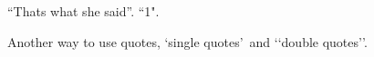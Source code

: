 \documentclass{article}
\begin{document}
``Thats what she said''.
``1".

Another way to use quotes, \lq single quotes\rq\ and 
\lq\lq double quotes\rq\rq.
\end{document}
